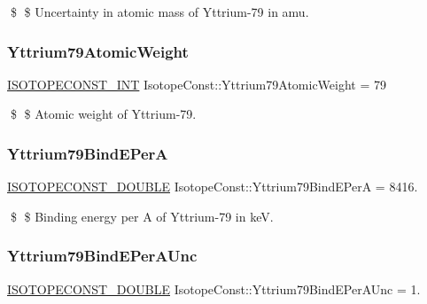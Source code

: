 \$ \$ Uncertainty in atomic mass of Yttrium-\/79 in amu. \mbox{\label{group___isotope_const-_yttrium-_y79_gab0a6a5ca791c0166bfa7c6ea257218c9}} 
\subsubsection{\texorpdfstring{Yttrium79\+Atomic\+Weight}{Yttrium79AtomicWeight}}
{\footnotesize\ttfamily \mbox{\hyperlink{group___isotope_const-_macros_ga5f18360b3e99483a35c32d789e62621c}{I\+S\+O\+T\+O\+P\+E\+C\+O\+N\+S\+T\+\_\+\+I\+NT}} Isotope\+Const\+::\+Yttrium79\+Atomic\+Weight = 79}

\$ \$ Atomic weight of Yttrium-\/79. \mbox{\label{group___isotope_const-_yttrium-_y79_ga11caf8c092225f001a48370c0acb661f}} 
\subsubsection{\texorpdfstring{Yttrium79\+Bind\+E\+PerA}{Yttrium79BindEPerA}}
{\footnotesize\ttfamily \mbox{\hyperlink{group___isotope_const-_macros_ga8f45a7272ce02c0b4c65c44636ed719a}{I\+S\+O\+T\+O\+P\+E\+C\+O\+N\+S\+T\+\_\+\+D\+O\+U\+B\+LE}} Isotope\+Const\+::\+Yttrium79\+Bind\+E\+PerA = 8416.}

\$ \$ Binding energy per A of Yttrium-\/79 in keV. \mbox{\label{group___isotope_const-_yttrium-_y79_ga5cf7980c2d51d7a90cafd9f1f96c42ec}} 
\subsubsection{\texorpdfstring{Yttrium79\+Bind\+E\+Per\+A\+Unc}{Yttrium79BindEPerAUnc}}
{\footnotesize\ttfamily \mbox{\hyperlink{group___isotope_const-_macros_ga8f45a7272ce02c0b4c65c44636ed719a}{I\+S\+O\+T\+O\+P\+E\+C\+O\+N\+S\+T\+\_\+\+D\+O\+U\+B\+LE}} Isotope\+Const\+::\+Yttrium79\+Bind\+E\+Per\+A\+Unc = 1.}

